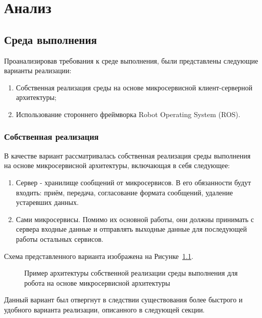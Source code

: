 \chapter{Анализ}\label{ch:ch2}

\section{Среда выполнения}\label{sec:ch2/sec1}

Проанализировав требования к среде выполнения, были представлены следующие варианты реализации:
\begin{enumerate}[beginpenalty=10000] %
  \item Собственная реализация среды на основе микросервисной клиент-серверной архитектуры;
  \item Использование стороннего фреймворка Robot Operating System (ROS).
\end{enumerate}

\subsection{Собственная реализация}
В качестве вариант рассматривалась собственная реализация среды выполнения на основе микросервисной архитектуры, включающая в себя следующее: 
\begin{enumerate}[beginpenalty=10000] %
  \item Сервер - хранилище сообщений от микросервисов. В его обязанности будут входить: приём, передача, согласование формата сообщений, удаление устаревших данных.
  \item Сами микросервисы. Помимо их основной работы, они должны принимать с сервера входные данные и отправлять выходные данные для последующей работы остальных сервисов.
\end{enumerate}

Схема представленного варианта изображена на Рисунке~\cref{fig:microservice}.

\begin{figure}[ht]
    \caption{Пример архитектуры собственной реализации среды выполнения для робота на основе микросервисной архитектуры}\label{fig:microservice}
\end{figure}

Данный вариант был отвергнут в следствии существования более быстрого и удобного варианта реализации, описанного в следующей секции.

